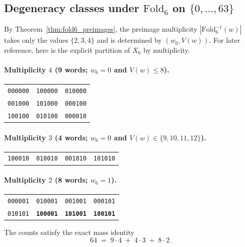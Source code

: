 \subsection{Degeneracy classes under \texorpdfstring{$\mathrm{Fold}_6$}{Fold\_6} on \texorpdfstring{$\{0,\dots,63\}$}{0..63}}
By Theorem~\ref{thm:fold6_preimages}, the preimage multiplicity $|\mathrm{Fold}_6^{-1}(w)|$ takes only the values $\{2,3,4\}$ and is determined by $(w_6,V(w))$.
For later reference, here is the explicit partition of $X_6$ by multiplicity.

\paragraph{Multiplicity $4$ (9 words; $w_6=0$ and $V(w)\le 8$).}
\begin{center}
\renewcommand{\arraystretch}{1.05}
\begin{tabular}{lll}
\texttt{000000} & \texttt{100000} & \texttt{010000}\\
\texttt{001000} & \texttt{101000} & \texttt{000100}\\
\texttt{100100} & \texttt{010100} & \texttt{000010}\\
\end{tabular}
\end{center}

\paragraph{Multiplicity $3$ (4 words; $w_6=0$ and $V(w)\in\{9,10,11,12\}$).}
\begin{center}
\renewcommand{\arraystretch}{1.05}
\begin{tabular}{llll}
\texttt{100010} & \texttt{010010} & \texttt{001010} & \texttt{101010}\\
\end{tabular}
\end{center}

\paragraph{Multiplicity $2$ (8 words; $w_6=1$).}
\begin{center}
\renewcommand{\arraystretch}{1.05}
\begin{tabular}{llll}
\texttt{000001} & \texttt{010001} & \texttt{001001} & \texttt{000101}\\
\texttt{010101} & \textbf{\texttt{100001}} & \textbf{\texttt{101001}} & \textbf{\texttt{100101}}\\
\end{tabular}
\end{center}

The counts satisfy the exact mass identity
\[
64 \;=\; 9\cdot 4\;+\;4\cdot 3\;+\;8\cdot 2.
\]



